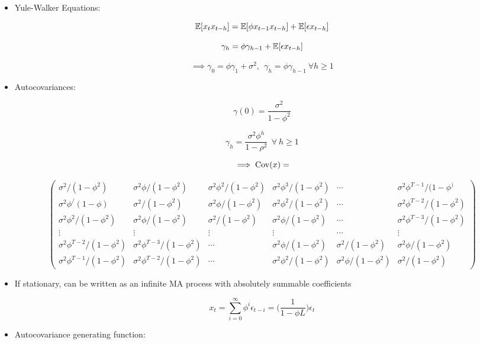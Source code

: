 \begin{itemize}

\item Yule-Walker Equations: 

\[
\mathbb{E}[x_t x_{t-h} ]= \mathbb{E}[ \phi x_{t-1}x_{t-h}] + \mathbb{E}[ \epsilon x_{t-h}]
\]

\[
\gamma_h = \phi \gamma_{h-1} + \mathbb{E}[ \epsilon x_{t-h}]
\]

\[
\implies \gamma_0 = \phi \gamma_1+\sigma^2,  \  \ \gamma_h = \phi \gamma_{h-1} \ \forall h \geq 1 
\]

\item Autocovariances:

\[
\gamma(0) = \frac{\sigma^2}{1 - \phi^2}
\]


\[
\gamma_h = \frac{\sigma^2 \phi^h}{1 - \rho^2} \ \ \forall \ h \geq 1
\]

\[
\implies \mathrm{Cov}(x) = 
\]

\[
\begin{pmatrix} 
\sigma^2/(1 - \phi^2) &  \sigma^2\phi/(1 - \phi^2) & \sigma^2\phi^2/(1 - \phi^2)  &  \sigma^2\phi^3/(1 - \phi^2) & \cdots &  \sigma^2\phi^{T - 1} /(1 - \phi^) \\
\sigma^2\phi^/(1 - \phi)& \sigma^2/(1 - \phi^2) & \sigma^2\phi/(1 - \phi^2) & \sigma^2\phi^2/(1 - \phi^2) & \cdots & \sigma^2\phi^{T - 2}/(1 - \phi^2) \\
\sigma^2\phi^2/(1 - \phi^2) & \sigma^2\phi/(1 - \phi^2) & \sigma^2/(1 - \phi^2) & \sigma^2\phi/(1 - \phi^2) & \cdots & \sigma^2\phi^{T - 3}/(1 - \phi^2)  \\
\vdots & \vdots & \vdots & \vdots & \cdots & \vdots \\
\sigma^2\phi^{T-2}/(1 - \phi^2) & \sigma^2\phi^{T-3}/(1 - \phi^2) & \cdots &\sigma^2\phi/(1 - \phi^2)  & \sigma^2/(1 - \phi^2) &\sigma^2\phi/(1 - \phi^2) \\
\sigma^2\phi^{T-1} /(1 - \phi^2) & \sigma^2\phi^{T-2}/(1 - \phi^2) &  \cdots & \sigma^2\phi^2/(1 - \phi^2)  & \sigma^2\phi/(1 - \phi^2)  & \sigma^2/(1 - \phi^2)
\end{pmatrix} 
\]

\item If stationary, can be written as an infinite MA process with absolutely summable coefficients

\[
x_t = \sum_{i=0}^ \infty \phi^i \epsilon_{t-i} = \bigg( \frac{1}{1 - \phi L} \bigg) \epsilon_t
\]

\item Autocovariance generating function:


\end{itemize}
